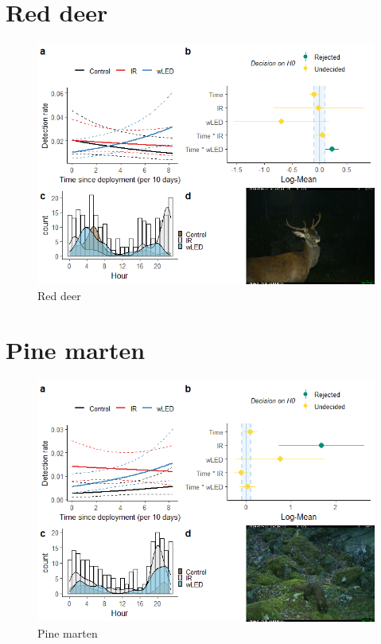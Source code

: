 \begin{table}[ht]
\newpage
\section{Red deer}

\begin{figure}
		  \centering
	\includegraphics[scale=.9]{../R/glmm_sp_files/figure-html/hjort2-1.png}
\caption[Red deer]
{Red deer}
\end{figure}






\newpage
\section{Pine marten}

\begin{figure}
		  \centering
	\includegraphics[scale=.9]{../R/glmm_sp_files/figure-html/maar2-1.png}
\caption[Pine marten]
{Pine marten}
\end{figure}







\end{table}
